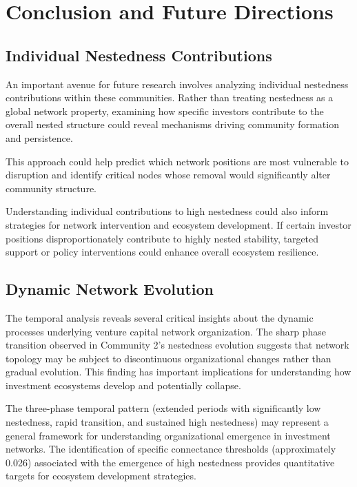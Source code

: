 
\section{Conclusion and Future Directions}

\subsection{Individual Nestedness Contributions}

An important avenue for future research involves analyzing individual nestedness contributions within these communities. Rather than treating nestedness as a global network property, examining how specific investors contribute to the overall nested structure could reveal mechanisms driving community formation and persistence. 

This approach could help predict which network positions are most vulnerable to disruption and identify critical nodes whose removal would significantly alter community structure.

Understanding individual contributions to high nestedness could also inform strategies for network intervention and ecosystem development. If certain investor positions disproportionately contribute to highly nested stability, targeted support or policy interventions could enhance overall ecosystem resilience.

\subsection{Dynamic Network Evolution}

The temporal analysis reveals several critical insights about the dynamic processes underlying venture capital network organization. The sharp phase transition observed in Community 2's nestedness evolution suggests that network topology may be subject to discontinuous organizational changes rather than gradual evolution. This finding has important implications for understanding how investment ecosystems develop and potentially collapse.

The three-phase temporal pattern (extended periods with significantly low nestedness, rapid transition, and sustained high nestedness) may represent a general framework for understanding organizational emergence in investment networks. The identification of specific connectance thresholds (approximately 0.026) associated with the emergence of high nestedness provides quantitative targets for ecosystem development strategies. 

